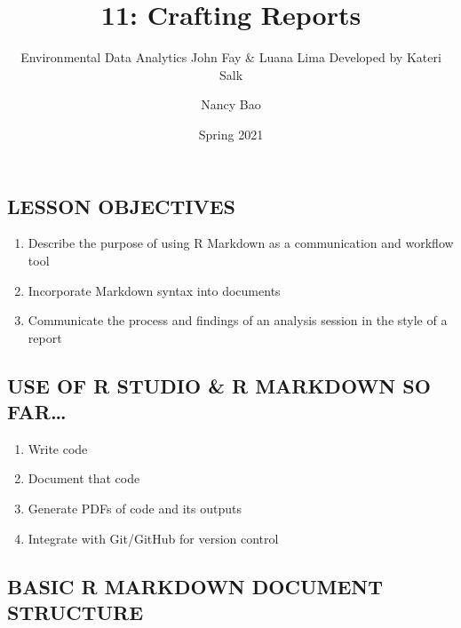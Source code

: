\documentclass[
]{article}
\title{11: Crafting Reports}
\subtitle{Environmental Data Analytics \textbar{} John Fay \& Luana Lima
\textbar{} Developed by Kateri Salk}
\author{Nancy Bao}
\date{Spring 2021}
\providecommand{\tightlist}{%
  \setlength{\itemsep}{0pt}\setlength{\parskip}{0pt}}
\begin{document}
\maketitle

\hypertarget{lesson-objectives}{%
\subsection{LESSON OBJECTIVES}\label{lesson-objectives}}

\begin{enumerate}
\def\labelenumi{\arabic{enumi}.}
\tightlist
\item
  Describe the purpose of using R Markdown as a communication and
  workflow tool
\item
  Incorporate Markdown syntax into documents
\item
  Communicate the process and findings of an analysis session in the
  style of a report
\end{enumerate}

\hypertarget{use-of-r-studio-r-markdown-so-far}{%
\subsection{USE OF R STUDIO \& R MARKDOWN SO
FAR\ldots{}}\label{use-of-r-studio-r-markdown-so-far}}

\begin{enumerate}
\def\labelenumi{\arabic{enumi}.}
\tightlist
\item
  Write code
\item
  Document that code
\item
  Generate PDFs of code and its outputs
\item
  Integrate with Git/GitHub for version control
\end{enumerate}

\hypertarget{basic-r-markdown-document-structure}{%
\subsection{BASIC R MARKDOWN DOCUMENT
STRUCTURE}\label{basic-r-markdown-document-structure}}
\end{document}
